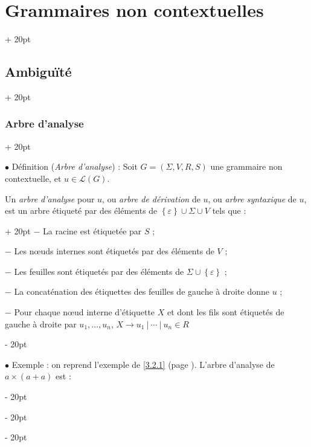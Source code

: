 \documentclass[a4paper, 12pt, twoside]{article}
\newcommand{\lr}[1]{\left( #1 \right)}
\newcommand{\set}[1]{\left\{ #1 \right\}}
\newcommand{\ind}[1][20pt]{\advance\leftskip + #1}
\newcommand{\deind}[1][20pt]{\advance\leftskip - #1}
\newenvironment{indt}[2][20pt]{#2 \par \ind[#1]}{\par \deind} %
\begin{document}
\begin{indt}{\section{Grammaires non contextuelles}}
\begin{indt}{\subsection{Ambiguïté}}
\begin{indt}{\subsubsection{Arbre d'analyse}}
                \vspace{12pt}
                
                $\bullet$ Définition (\textit{Arbre d'analyse}) :
                Soit $G = \lr{\Sigma, V, R, S}$ une grammaire non contextuelle, et $u \in \mathcal L(G)$.

                \begin{indt}{Un \emph{arbre d'analyse} pour $u$, ou \emph{arbre de dérivation} de $u$, ou \emph{arbre syntaxique} de $u$, est un arbre étiqueté par des éléments de $\set \varepsilon \cup \Sigma \cup V$ tels que :}
                    $-$ La racine est étiquetée par $S$ ;

                    $-$ Les n\oe uds internes sont étiquetés par des éléments de $V$ ;

                    $-$ Les feuilles sont étiquetés par des éléments de $\Sigma \cup \set \varepsilon$ ;

                    $-$ La concaténation des étiquettes des feuilles de gauche à droite donne $u$ ;

                    $-$ Pour chaque n\oe ud interne d'étiquette $X$ et dont les fils sont étiquetés de gauche à droite par $u_1, \ldots, u_n$, $X \rightarrow u_1\ |\ \cdots\ |\ u_n \in R$
                \end{indt}

                \vspace{12pt}
                
                $\bullet$ Exemple : on reprend l'exemple de \ref{3.2.1} (page \pageref{3.2.1}). L'arbre d'analyse de $a \times (a + a)$ est :
                
                \begin{center}
                \end{center}


\end{indt}
\end{indt}
\end{indt}
\end{document}
